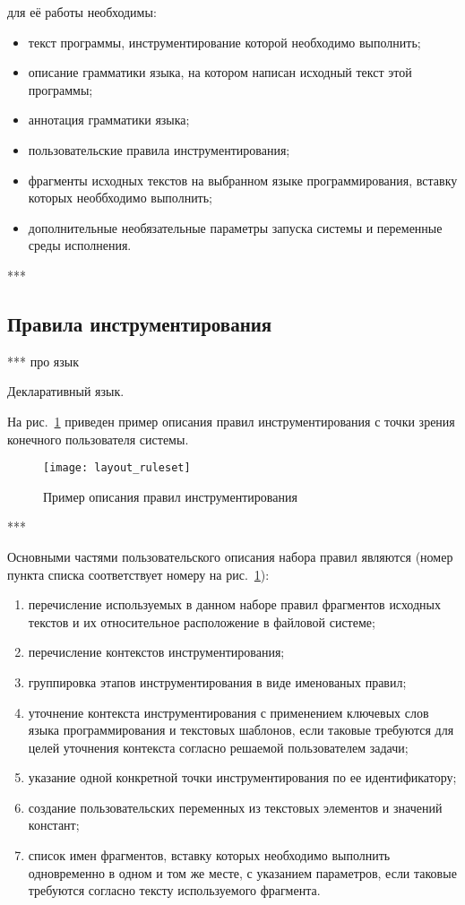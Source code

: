 для её работы необходимы:
\begin{itemize}[noitemsep]
  \item текст программы, инструментирование которой необходимо выполнить;
  \item описание грамматики языка, на котором написан исходный текст этой программы;
  \item аннотация грамматики языка;
  \item пользовательские правила инструментирования;
  \item фрагменты исходных текстов на выбранном языке программирования, вставку которых необбходимо выполнить;
  \item дополнительные необязательные параметры запуска системы и переменные среды исполнения.
\end{itemize}

***

\subsection{Правила инструментирования}

***
про язык

Декларативный язык.

На рис.~\ref{fig:layout_ruleset} приведен пример описания правил инструментирования с точки зрения конечного пользователя системы.

\begin{figure}[!h]
	\centering
	\texttt{[image: layout\_ruleset]}
	\caption{Пример описания правил инструментирования}
	\label{fig:layout_ruleset}
\end{figure}

***

Основными частями пользовательского описания набора правил являются (номер пункта списка соответствует номеру на рис.~\ref{fig:layout_ruleset}):
\begin{enumerate}[noitemsep]
  \item перечисление используемых в данном наборе правил фрагментов исходных текстов и их относительное расположение в файловой системе;
  \item перечисление контекстов инструментирования;
  \item группировка этапов инструментирования в виде именованых правил;
  \item уточнение контекста инструментирования с применением ключевых слов языка программирования и текстовых шаблонов, если таковые требуются для целей уточнения контекста согласно решаемой пользователем задачи;
  \item указание одной конкретной точки инструментирования по ее идентификатору;
  \item создание пользовательских переменных из текстовых элементов и значений констант;
  \item список имен фрагментов, вставку которых необходимо выполнить одновременно в одном и том же месте, с указанием параметров, если таковые требуются согласно тексту используемого фрагмента.
\end{enumerate}

